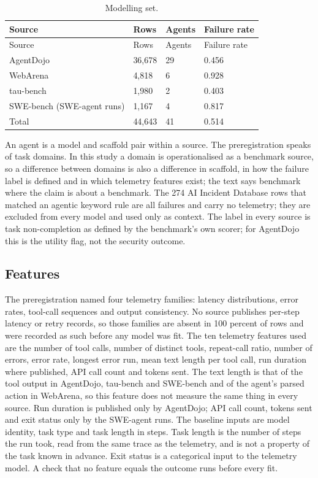 \documentclass[
  11pt,
  a4paper,
]{article}
\begin{document}
\begin{longtable}[]{@{}llll@{}}
\caption{Modelling set.}\tabularnewline
\toprule\noalign{}
Source & Rows & Agents & Failure rate \\
\midrule\noalign{}
\endfirsthead
\toprule\noalign{}
Source & Rows & Agents & Failure rate \\
\midrule\noalign{}
\endhead
\bottomrule\noalign{}
\endlastfoot
AgentDojo & 36,678 & 29 & 0.456 \\
WebArena & 4,818 & 6 & 0.928 \\
tau-bench & 1,980 & 2 & 0.403 \\
SWE-bench (SWE-agent runs) & 1,167 & 4 & 0.817 \\
Total & 44,643 & 41 & 0.514 \\
\end{longtable}

An agent is a model and scaffold pair within a source. The
preregistration speaks of task domains. In this study a domain is
operationalised as a benchmark source, so a difference between domains
is also a difference in scaffold, in how the failure label is defined
and in which telemetry features exist; the text says benchmark where the
claim is about a benchmark. The 274 AI Incident Database rows that
matched an agentic keyword rule are all failures and carry no telemetry;
they are excluded from every model and used only as context. The label
in every source is task non-completion as defined by the benchmark's own
scorer; for AgentDojo this is the utility flag, not the security
outcome.

\hypertarget{features}{%
\subsection{Features}\label{features}}

The preregistration named four telemetry families: latency
distributions, error rates, tool-call sequences and output consistency.
No source publishes per-step latency or retry records, so those families
are absent in 100 percent of rows and were recorded as such before any
model was fit. The ten telemetry features used are the number of tool
calls, number of distinct tools, repeat-call ratio, number of errors,
error rate, longest error run, mean text length per tool call, run
duration where published, API call count and tokens sent. The text
length is that of the tool output in AgentDojo, tau-bench and SWE-bench
and of the agent's parsed action in WebArena, so this feature does not
measure the same thing in every source. Run duration is published only
by AgentDojo; API call count, tokens sent and exit status only by the
SWE-agent runs. The baseline inputs are model identity, task type and
task length in steps. Task length is the number of steps the run took,
read from the same trace as the telemetry, and is not a property of the
task known in advance. Exit status is a categorical input to the
telemetry model. A check that no feature equals the outcome runs before
every fit.
\end{document}
